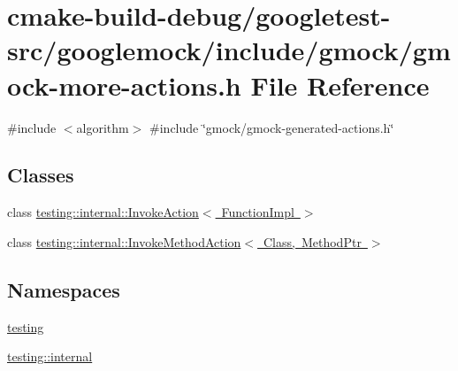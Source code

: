 \hypertarget{gmock-more-actions_8h}{}\section{cmake-\/build-\/debug/googletest-\/src/googlemock/include/gmock/gmock-\/more-\/actions.h File Reference}
\label{gmock-more-actions_8h}
{\ttfamily \#include $<$algorithm$>$}\newline
{\ttfamily \#include \char`\"{}gmock/gmock-\/generated-\/actions.\+h\char`\"{}}\newline
\subsection*{Classes}
\begin{DoxyCompactItemize}
\item 
class \mbox{\hyperlink{classtesting_1_1internal_1_1InvokeAction}{testing\+::internal\+::\+Invoke\+Action$<$ Function\+Impl $>$}}
\item 
class \mbox{\hyperlink{classtesting_1_1internal_1_1InvokeMethodAction}{testing\+::internal\+::\+Invoke\+Method\+Action$<$ Class, Method\+Ptr $>$}}
\end{DoxyCompactItemize}
\subsection*{Namespaces}
\begin{DoxyCompactItemize}
\item 
 \mbox{\hyperlink{namespacetesting}{testing}}
\item 
 \mbox{\hyperlink{namespacetesting_1_1internal}{testing\+::internal}}
\end{DoxyCompactItemize}
